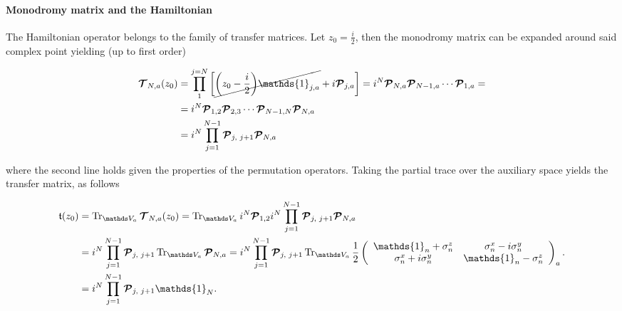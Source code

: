 \documentclass{homework}
\begin{document}
\paragraph{\textbf{Monodromy matrix and the Hamiltonian}}

The Hamiltonian operator belongs to the family of transfer matrices. Let $z_0 = \frac{i}{2}$, then the monodromy matrix can be expanded around said complex point yielding (up to first order)

\begin{equation} 
    \begin{split}
         \bmt_{N,a}(z_0) &= \prod_1^{j=N} \bigg[ \cancel{\bigg(z_0-\frac{i}{2}\bigg) \mathds{1}_{j, a}} + i \bm{\mathcal{P}}_{j, a}\bigg] = i^N \bm{\mathcal{P}}_{N, a} \bm{\mathcal{P}}_{N-1, a} \cdots \bm{\mathcal{P}}_{1, a} = \\
         &= i^N \bm{\mathcal{P}}_{1, 2} \bm{\mathcal{P}}_{2, 3} \cdots \bm{\mathcal{P}}_{N-1, N} \bm{\mathcal{P}}_{N, a}\\
         &= i^N \prod_{j=1}^{N-1} \bm{\mathcal{P}}_{j, \blanky j+1} \bm{\mathcal{P}}_{N, a}
    \end{split}
\end{equation}

where the second line holds given the properties of the permutation operators. Taking the partial trace over the auxiliary space yields the transfer matrix, as follows 

\begin{equation}
    \begin{split}
        \mathfrak{t}(z_0) &= \Tr_{\vds_a}  \bmt_{N,a}(z_0) = \Tr_{\vds_a} i^N \bm{\mathcal{P}}_{1, 2} i^N \prod_{j=1}^{N-1} \bm{\mathcal{P}}_{j, \blanky j+1} \bm{\mathcal{P}}_{N, a} \\
        &= i^N \prod_{j=1}^{N-1} \bm{\mathcal{P}}_{j, \blanky j+1}
        \Tr_{\vds_a} \bm{\mathcal{P}}_{N, a}    = i^N \prod_{j=1}^{N-1} \bm{\mathcal{P}}_{j, \blanky j+1} \Tr_{\vds_a} \frac{1}{2}\left(\begin{array}{cc}
       \mathds{1}_n + \sigma^{z}_{n} &  \sigma^{x}_{n} - i\sigma^{y}_{n} \\
       \sigma^{x}_{n} + i\sigma^{y}_{n}  & \mathds{1}_n - \sigma^{z}_{n} \\
        \end{array}\right)_a. \\
        &= i^N \prod_{j=1}^{N-1} \bm{\mathcal{P}}_{j, \blanky j+1} \mathds{1}_N.
    \end{split}
\end{equation}
\end{document}
